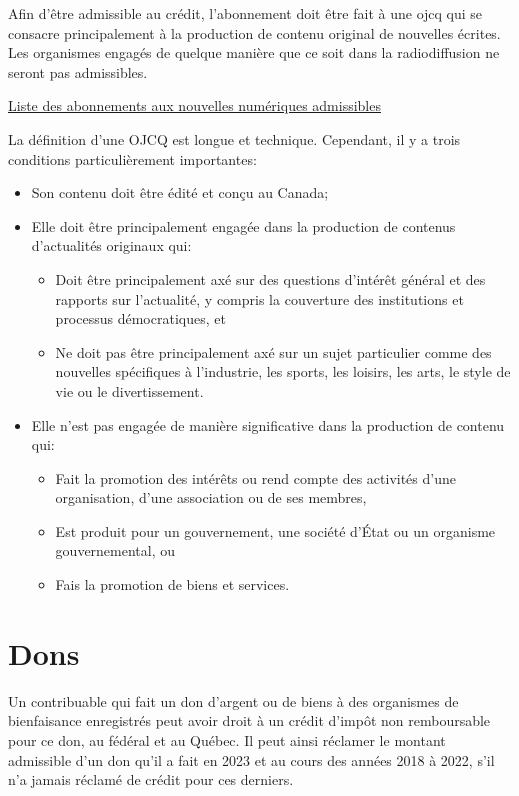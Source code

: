 Afin d'être admissible au crédit, l'abonnement doit être fait à une \og \acrfull{ojcq} \fg{} qui se consacre principalement à la production de contenu original de nouvelles écrites. Les organismes engagés de quelque manière que ce soit dans la radiodiffusion ne seront pas admissibles.

\cat\href{https://www.canada.ca/fr/agence-revenu/services/impot/particuliers/sujets/tout-votre-declaration-revenus/declaration-revenus/remplir-declaration-revenus/deductions-credits-depenses/toutes-deductions-tous-credits-toutes-depenses/abonnement-aux-actualites-numeriques/liste-abonnements-nouvelles-numeriques-admissibles.html}{Liste des abonnements aux nouvelles numériques admissibles}

La définition d'une OJCQ est longue et technique. Cependant, il y a trois conditions particulièrement importantes:
\begin{itemize}
	\item Son contenu doit être édité et conçu au Canada;
	\item Elle doit être principalement engagée dans la production de contenus d'actualités originaux qui:
	\begin{itemize}
		\item Doit être principalement axé sur des questions d'intérêt général et des rapports sur l'actualité, y compris la couverture des institutions et processus démocratiques, et
		\item Ne doit pas être principalement axé sur un sujet particulier comme des nouvelles spécifiques à l'industrie, les sports, les loisirs, les arts, le style de vie ou le divertissement.
	\end{itemize}
	\item Elle n'est pas engagée de manière significative dans la production de contenu qui:
	\begin{itemize}
		\item Fait la promotion des intérêts ou rend compte des activités d'une organisation, d'une association ou de ses membres,
		\item Est produit pour un gouvernement, une société d'État ou un organisme gouvernemental, ou
		\item Fais la promotion de biens et services.
	\end{itemize}
\end{itemize}



\section{Dons}
\begin{intro}
	Un contribuable qui fait un don d'argent ou de biens à des organismes de bienfaisance enregistrés peut avoir droit à un crédit d'impôt non remboursable pour ce don, au fédéral et au Québec. Il peut ainsi réclamer le montant admissible d'un don qu'il a fait en 2023 et au cours des années 2018 à 2022, s'il n'a jamais réclamé de crédit pour ces derniers.
\end{intro}


